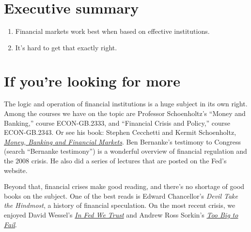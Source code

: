 \section*{Executive summary}

\begin{enumerate}
\item Financial markets work best when based on effective institutions.
\item It's hard to get that exactly right.
\end{enumerate}


\begin{comment}
\section*{Review questions}

\begin{enumerate}

\item ...
\end{enumerate}
\end{comment}

\section*{If you're looking for more}

The logic and operation of financial institutions is a huge subject
in its own right.
Among the courses we have on the topic are Professor Schoenholtz's
``Money and Banking,'' course ECON-GB.2333,
and ``Financial Crisis and Policy,'' course ECON-GB.2343.
Or see his book:
Stephen Cecchetti and Kermit Schoenholtz,
\href{http://www.amazon.com/Banking-Financial-Markets-Stephen-Cecchetti/dp/007337590X/}
{\it Money, Banking and Financial Markets\/}.
Ben Bernanke's  testimony to Congress (search ``Bernanke 
 testimony'')
is a wonderful overview of financial regulation and the 2008 crisis.
He also did a series of lectures that are posted on the Fed's website.

Beyond that, financial crises make good reading, and there's no shortage
of good books on the subject.
One of the best reads is Edward Chancellor's {\it Devil Take the Hindmost\/},
a history of financial speculation.
On the most recent crisis,
we enjoyed David Wessel's
\href{http://www.amazon.com/FED-We-Trust-Bernankes-Great/dp/0307459691/}
{\it In Fed We Trust\/}
and Andrew Ross Sorkin's
\href{http://www.amazon.com/Too-Big-Fail-Washington-FinancialSystem/dp/0143120271/}
{\it Too Big to Fail\/}.
